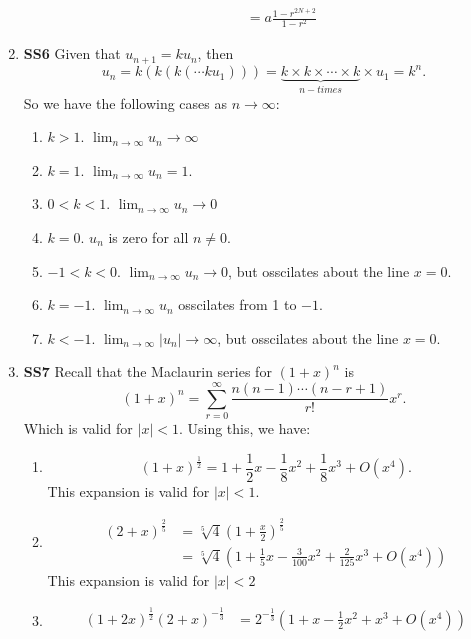 \documentclass[12pt,oneside]{book}
\begin{document}
\begin{enumerate}
\begin{enumerate}
\begin{align*}
                &= a \frac{1-r^{2N+2}}{1-r^2}
            \end{align*}
        \end{enumerate}
        \item \textbf{SS6} Given that $u_{n + 1} = k u_n$, then \[
            u_n = k ( k ( k ( \cdots k u_1))) = \underbrace{k \times k \times \cdots \times k}_{n-times} \times u_1 = k^n
        .\]  So we have the following cases as $n \to \infty$: \begin{enumerate}
            \item $k > 1$. $\lim_{n \to \infty} u_n \to \infty$
            \item $k = 1$. $\lim_{n \to \infty} u_n = 1$.
            \item $0 < k < 1$. $\lim_{n \to \infty} u_n \to 0$
            \item $k = 0$. $u_n$ is zero for all $n \neq 0$.
            \item $-1 < k < 0$. $\lim_{n \to \infty} u_n \to 0$, but osscilates about the line $x = 0$.
            \item $k = -1$. $\lim_{n \to \infty} u_n$ osscilates from 1 to $-1$.
            \item $k < -1$. $\lim_{n \to \infty} |u_n| \to \infty$, but osscilates about the line $x = 0$.
        \end{enumerate}
        \item \textbf{SS7} Recall that the Maclaurin series for $(1+x)^n$ is \[
            (1+x)^n = \sum_{r = 0}^ \infty \frac{n(n-1) \cdots (n-r+1)}{r!} x^r
        .\] Which is valid for $|x| < 1$. Using this, we have: \begin{enumerate}
            \item \[
                (1+x)^{\frac{1}{2}} = 1 + \frac{1}{2}x - \frac{1}{8}x^2 + \frac{1}{8}x^3 + O(x^4)
            .\]  This expansion is valid for $|x| < 1$.
            \item \begin{align*}
                (2 + x)^{\frac{2}{5}} &= \sqrt[5]{4} \left( 1 + \frac{x}{2} \right) ^{\frac{2}{5}} \\
                &= \sqrt[5]{4} \left( 1 + \frac{1}{5}x - \frac{3}{100}x^2 + \frac{2}{125}x^3 + O(x^4) \right)
            \end{align*} This expansion is valid for $|x| < 2$
            \item \begin{align*}
                (1+2x)^{\frac{1}{2}} (2+x)^{-\frac{1}{3}} &= 2^{-\frac{1}{3}} \left( 1 + x - \frac{1}{2}x^2 + x^3 + O(x^4) \right) \\ 

\end{align*}
\end{enumerate}
\end{enumerate}
\end{document}
